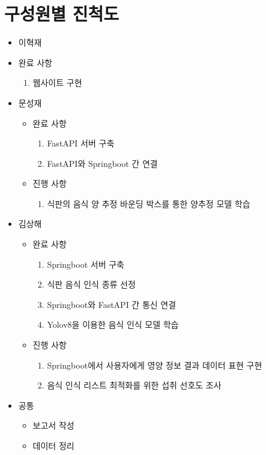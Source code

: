 \documentclass[10pt, a4paper]{article}
\theoremstyle{definition}
\begin{document}
    \newpage


    \section{구성원별 진척도}
    \begin{itemize}
        \item 이혁재
        \item 완료 사항
        \begin{enumerate}
            \item 웹사이트 구현
        \end{enumerate}
        \item 문성재
        \begin{itemize}
            \item 완료 사항
            \begin{enumerate}
                \item FastAPI 서버 구축
                \item FastAPI와 Springboot 간 연결
            \end{enumerate}
            \item 진행 사항
            \begin{enumerate}
                \item 식판의 음식 양 추정 바운딩 박스를 통한 양추정 모델 학습
            \end{enumerate}
        \end{itemize}
        \item 김상해
        \begin{itemize}
            \item 완료 사항
            \begin{enumerate}
                \item Springboot 서버 구축
                \item 식판 음식 인식 종류 선정
                \item Springboot와 FastAPI 간 통신 연결
                \item Yolov8을 이용한 음식 인식 모델 학습
            \end{enumerate}
            \item 진행 사항
            \begin{enumerate}
                \item Springboot에서 사용자에게 영양 정보 결과 데이터 표현 구현
                \item 음식 인식 리스트 최적화를 위한 섭취 선호도 조사
            \end{enumerate}
        \end{itemize}
        \item 공통
        \begin{itemize}
            \item 보고서 작성
            \item 데이터 정리
        \end{itemize}
    \end{itemize}
    \newpage
\end{document}
